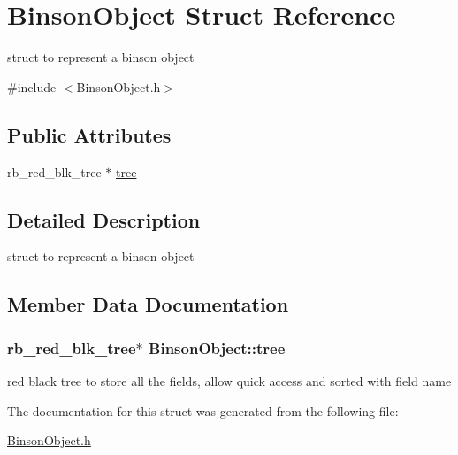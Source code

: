 \hypertarget{structBinsonObject}{\section{Binson\-Object Struct Reference}
\label{structBinsonObject}
}


struct to represent a binson object  




{\ttfamily \#include $<$Binson\-Object.\-h$>$}

\subsection*{Public Attributes}
\begin{DoxyCompactItemize}
\item 
rb\-\_\-red\-\_\-blk\-\_\-tree $\ast$ \hyperlink{structBinsonObject_a083ba69fcdc8f2e7a84e8a80a71ab111}{tree}
\end{DoxyCompactItemize}


\subsection{Detailed Description}
struct to represent a binson object 

\subsection{Member Data Documentation}
\hypertarget{structBinsonObject_a083ba69fcdc8f2e7a84e8a80a71ab111}{
\subsubsection[{tree}]{\setlength{\rightskip}{0pt plus 5cm}rb\-\_\-red\-\_\-blk\-\_\-tree$\ast$ Binson\-Object\-::tree}}\label{structBinsonObject_a083ba69fcdc8f2e7a84e8a80a71ab111}
red black tree to store all the fields, allow quick access and sorted with field name 

The documentation for this struct was generated from the following file\-:\begin{DoxyCompactItemize}
\item 
\hyperlink{BinsonObject_8h}{Binson\-Object.\-h}\end{DoxyCompactItemize}
